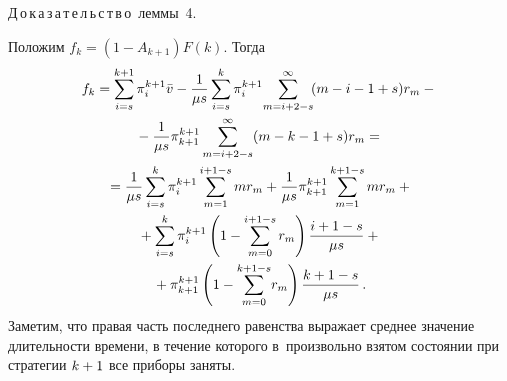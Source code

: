 \begin{multicols}{2}
{\smallskip

\noindent
Д\,о\,к\,а\,з\,а\,т\,е\,л\,ь\,с\,т\,в\,о\ леммы~4.

Положим $f_k=\left(1-A_{k+1}\right)F(k).$ Тогда
\begin{multline*}
f_k=\sum\limits_{i=s}^{k+1}\pi_i^{k+1}\bar{v}-\displaystyle\frac{\displaystyle 1\mathstrut}{\displaystyle \mu s\mathstrut}
\sum\limits_{i=s}^{k}\pi_i^{k+1}\!\sum\limits_{m=i+2-s}^{\infty}\!(m-i-1+s)r_m-{}\\
{}-
\displaystyle\frac{\displaystyle 1\mathstrut}{\displaystyle \mu s\mathstrut}\pi_{k+1}^{k+1}\sum\limits_{m=i+2-s}^{\infty}(m-k-1+s)r_m={}
\\
{}=\displaystyle\frac{\displaystyle 1\mathstrut}{\displaystyle \mu s\mathstrut}\sum\limits_{i=s}^{k}\pi_i^{k+1}\sum\limits_{m=1}^{i+1-s}mr_m+
\displaystyle\frac{\displaystyle 1\mathstrut}{\displaystyle \mu s\mathstrut}\pi_{k+1}^{k+1}\sum\limits_{m=1}^{k+1-s}mr_m+{}\\
{}+
\sum\limits_{i=s}^k\pi_i^{k+1} \left(
1-\sum\limits_{m=0}^{i+1-s}r_m\right)\displaystyle\frac{\displaystyle i+1-s\mathstrut}{\displaystyle \mu s\mathstrut}+{}
\\
{}+\pi_{k+1}^{k+1}
\left(1-\sum\limits_{m=0}^{k+1-s}\!r_m\right)\displaystyle\frac{\displaystyle k+1-s\mathstrut}{\displaystyle \mu s\mathstrut}\,.
\end{multline*}
Заметим, что правая часть последнего равенства выражает среднее значение 
длительности времени,
в течение которого в~произвольно взятом состоянии при стратегии $k\hm+1$ все 
приборы заняты.

}
\end{multicols}
